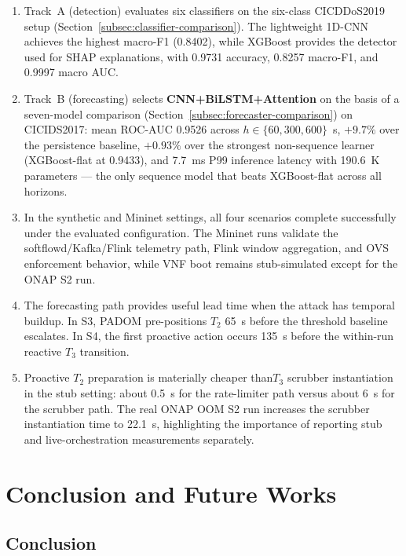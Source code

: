 \documentclass[12pt, a4paper, reqno, oneside]{book}
\newcommand{\padonap}{\textsc{PADOM}}
\newcommand{\tier}[1]{$T_{#1}$}
\begin{document}
\begin{enumerate}
  \item Track~A (detection) evaluates six classifiers on the six-class CICDDoS2019 setup (Section~\ref{subsec:classifier-comparison}). The lightweight 1D-CNN achieves the highest macro-F1 (0.8402), while XGBoost provides the detector used for SHAP explanations, with 0.9731 accuracy, 0.8257 macro-F1, and 0.9997 macro AUC.

  \item Track~B (forecasting) selects \textbf{CNN+BiLSTM+Attention} on the basis of a seven-model comparison (Section~\ref{subsec:forecaster-comparison}) on CICIDS2017: mean ROC-AUC 0.9526 across $h\!\in\!\{60,300,600\}$~s, $+9.7\%$ over the persistence baseline, $+0.93\%$ over the strongest non-sequence learner (XGBoost-flat at 0.9433), and 7.7~ms P99 inference latency with 190.6~K parameters --- the only sequence model that beats XGBoost-flat across all horizons.

  \item In the synthetic and Mininet settings, all four scenarios complete successfully under the evaluated configuration. The Mininet runs validate the softflowd/Kafka/Flink telemetry path, Flink window aggregation, and OVS enforcement behavior, while VNF boot remains stub-simulated except for the ONAP S2 run.

  \item The forecasting path provides useful lead time when the attack has temporal buildup. In S3, \padonap{} pre-positions \tier{2} 65~s before the threshold baseline escalates. In S4, the first proactive action occurs 135~s before the within-run reactive \tier{3} transition.

  \item Proactive \tier{2} preparation is materially cheaper than\tier{3} scrubber instantiation in the stub setting: about 0.5~s for the rate-limiter path versus about 6~s for the scrubber path. The real ONAP OOM S2 run increases the scrubber instantiation time to 22.1~s, highlighting the importance of reporting stub and live-orchestration measurements separately.
\end{enumerate}

\chapter*{Conclusion and Future Works}
\label{ch:conclusion}

\section*{Conclusion}
\end{document}
